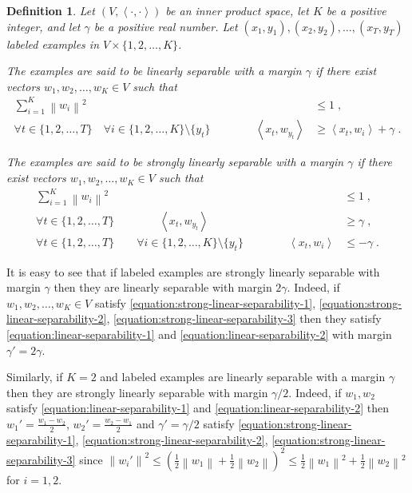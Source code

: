\documentclass[12pt]{article}
\newtheorem{definition}{Definition}
\newcommand{\ip}[2]{\left\langle #1, #2 \right\rangle} %
\newcommand{\norm}[1]{\left\| #1 \right\|}  %
\begin{document}
\begin{definition}
Let $(V,\ip{\cdot}{\cdot})$ be an inner product space, let $K$ be a positive
integer, and let $\gamma$ be a positive real number. Let $(x_1, y_1), (x_2,
y_2), \dots, (x_T, y_T)$ labeled examples in $V \times \{1,2,\dots,K\}$.

The examples are said to be \emph{linearly separable with a
margin $\gamma$} if there exist vectors $w_1, w_2, \dots, w_K \in V$ such
that
\begin{align}
\label{equation:linear-separability-1}
\sum_{i=1}^K \norm{w_i}^2 & \le 1 \; , \\
\label{equation:linear-separability-2}
\forall t \in \{1,2,\dots,T\} \quad \forall i \in \{1,2,\dots, K\} \setminus \{y_t\} \qquad \qquad \ip{x_t}{w_{y_t}} & \ge \ip{x_t}{w_i} + \gamma \; .
\end{align}

The examples are said to be \emph{strongly linearly separable with a
margin $\gamma$} if there exist vectors $w_1, w_2, \dots, w_K \in V$ such
that
\begin{align}
\label{equation:strong-linear-separability-1}
\sum_{i=1}^K \norm{w_i}^2 & \le 1 \; , \\
\label{equation:strong-linear-separability-2}
\forall t \in \{1,2,\dots,T\} \qquad \qquad \ip{x_t}{w_{y_t}} &\ge \gamma \; , \\
\label{equation:strong-linear-separability-3}
\forall t \in \{1,2,\dots,T\} \qquad \forall i \in \{1,2,\dots, K\} \setminus \{y_t\} \qquad \qquad \ip{x_t}{w_i} & \le - \gamma \; .
\end{align}
\end{definition}

It is easy to see that if labeled examples are strongly linearly
separable with margin $\gamma$ then they are linearly separable with margin
$2\gamma$. Indeed, if $w_1, w_2, \dots, w_K \in V$
satisfy \eqref{equation:strong-linear-separability-1},
\eqref{equation:strong-linear-separability-2},
\eqref{equation:strong-linear-separability-3} then they satisfy
\eqref{equation:linear-separability-1} and
\eqref{equation:linear-separability-2} with margin $\gamma' = 2\gamma$.

Similarly, if $K=2$ and labeled examples are linearly separable with a margin
$\gamma$ then they are strongly linearly separable with margin $\gamma/2$.
Indeed, if $w_1, w_2$ satisfy \eqref{equation:linear-separability-1} and
\eqref{equation:linear-separability-2} then $w_1' = \frac{w_1 - w_2}{2}$,
$w_2' = \frac{w_2 - w_1}{2}$ and $\gamma'=\gamma/2$ satisfy
\eqref{equation:strong-linear-separability-1},
\eqref{equation:strong-linear-separability-2},
\eqref{equation:strong-linear-separability-3} since $\norm{w_i'}^2 \le
(\frac{1}{2} \norm{w_1} + \frac{1}{2} \norm{w_2})^2 \le \frac{1}{2}\norm{w_1}^2 +
\frac{1}{2}\norm{w_2}^2$ for $i=1,2$.
\end{document}
